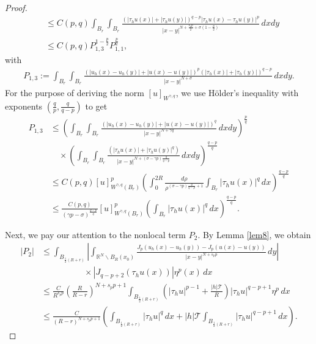 \documentclass[reqno,10pt]{amsart}
\numberwithin{equation}{section}
\begin{document}
\begin{proof}
\begin{align}
		&\le C(p,q)\int_{B_r}\int_{B_r}\frac{\left( |\tau_hu(x)|+|\tau_hu(y)|\right)^{q-p}|\tau_hu(x)-\tau_hu(y)|^p }{|x-y|^{N+\frac{s_pp}{2}+\sigma\left( 1-\frac{p}{2}\right) }}\,dxdy\nonumber\\
		&\le C(p,q)P_{1,3}^{1-\frac{p}{2}}P_{1,1}^{\frac{p}{2}},
	\end{align}
	with
	\begin{align*}
		P_{1,3}:=\int_{B_r}\int_{B_r}\frac{\left( |u_h(x)-u_h(y)|+|u(x)-u(y)|\right)^p\left( |\tau_h(x)|+|\tau_h(y)|\right)^{q-p}}{|x-y|^{N+\sigma}}\,dxdy.
	\end{align*}
	For the purpose of deriving the norm $[u]_{W^{\gamma,q}}$, we use H\"{o}lder's inequality with exponents $\left( \frac{q}{p},\frac{q}{q-p}\right) $ to get
	\begin{align}
		\label{9.9}
		P_{1,3}&\le\left( \int_{B_r}\int_{B_r}\frac{\left( |u_h(x)-u_h(y)|+|u(x)-u(y)|\right)^q }{|x-y|^{N+\gamma q}}\,dxdy\right)^{\frac{p}{q}}\nonumber\\
		&\quad\times\left( \int_{B_r}\int_{B_r}\frac{\left( |\tau_hu(x)|+|\tau_hu(y)|^q\right) }{|x-y|^{N+(\sigma-\gamma p)\frac{q}{q-p}}}\,dxdy\right)^{\frac{q-p}{q}}\nonumber\\
		&\le C(p,q)[u]^p_{W^{\gamma,q}(B_r)}\left( \int_0^{2R}\frac{d\rho}{\rho^{(\sigma-\gamma p)\frac{q}{q-p}+1}}\int_{B_r}|\tau_hu(x)|^q\,dx\right)^{\frac{q-p}{q}}\nonumber\\
		&\le \frac{C(p,q)}{(\gamma p-\sigma)^{\frac{q-p}{q}}}[u]^p_{W^{\gamma,q}(B_r)}\left( \int_{B_r}|\tau_hu(x)|^q\,dx\right)^{\frac{q-p}{q}}.
	\end{align}
	
	Next, we pay our attention to the nonlocal term $P_2$. By Lemma \ref{lem8}, we obtain
	\begin{align}
		\label{9.10}
		|P_2|&\le \int_{B_{\frac{1}{2}(R+r)}}\left| \int_{\mathbb{R}^N\backslash B_{R}(x_0)}\frac{J_p(u_h(x)-u_h(y))-J_p(u(x)-u(y))}{|x-y|^{N+s_pp}}\,dy\right|\nonumber\\
		&\qquad\qquad\quad\times \left|J_{q-p+2}(\tau_hu(x))\right|\eta^p(x)\,dx\nonumber\\
		&\le\frac{C}{R^{s_pp}}\left( \frac{R}{R-r}\right) ^{N+s_pp+1}\int_{B_{\frac{1}{2}(R+r)}}\left( |\tau_hu|^{p-1}+\frac{|h|\mathcal{T}}{R}\right)|\tau_hu|^{q-p+1}\eta^p\,dx\nonumber\\ 
		&\le\frac{C}{(R-r)^{N+s_pp+1}}\left( \int_{B_{\frac{1}{2}(R+r)}}|\tau_hu|^q\,dx+|h|\mathcal{T}\int_{B_{\frac{1}{2}(R+r)}}|\tau_hu|^{q-p+1}\,dx\right). 
	\end{align}
	

\end{proof}
\end{document}
